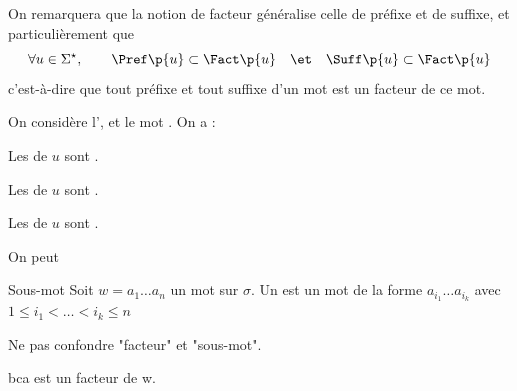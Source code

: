     On remarquera que la notion de facteur généralise celle de préfixe et de suffixe, et particulièrement que
    \[\forall u \in \Sigma^\star,\qquad \Pref\p{u} \subset \Fact\p{u} \quad\et\quad \Suff\p{u} \subset \Fact\p{u} \]
    c'est-à-dire que tout préfixe et tout suffixe d'un mot est un facteur de ce mot.
    
    \begin{example}{}{}
        On considère l', et le mot . On a :
        \begin{enumerate}
            \itt Les  de $u$ sont .
            
            \itt Les  de $u$ sont .
            
            \itt Les  de $u$ sont .
        \end{enumerate}
    \end{example}
    
    On peut 
    

    
    \begin{definition}{Sous-mot}{}
        Soit $w=a_1 \dots a_n$ un mot sur $\sigma$.
        Un  est un mot de la forme $a_{i_1} \dots a_{i_k}$ avec $1 \leq i_1 < \dots < i_k \leq n$
        
    \end{definition}
    
    \begin{warning}{}{}
        Ne pas confondre "facteur" et "sous-mot".
        \begin{enumerate}
            \itt bca est un facteur de w.
        \end{enumerate}
    \end{warning}
    

